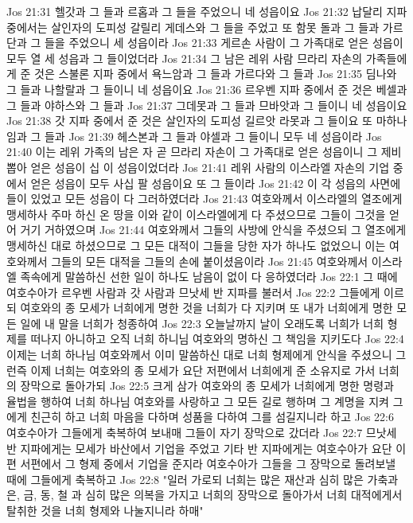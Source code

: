 Jos 21:31  헬갓과 그 들과 르홉과 그 들을 주었으니 네 성읍이요
Jos 21:32  납달리 지파 중에서는 살인자의 도피성 갈릴리 게데스와 그 들을 주었고 또 함못 돌과 그 들과 가르단과 그 들을 주었으니 세 성읍이라
Jos 21:33  게르손 사람이 그 가족대로 얻은 성읍이 모두 열 세 성읍과 그 들이었더라
Jos 21:34  그 남은 레위 사람 므라리 자손의 가족들에게 준 것은 스불론 지파 중에서 욕느암과 그 들과 가르다와 그 들과
Jos 21:35  딤나와 그 들과 나할랄과 그 들이니 네 성읍이요
Jos 21:36  르우벤 지파 중에서 준 것은 베셀과 그 들과 야하스와 그 들과
Jos 21:37  그데못과 그 들과 므바앗과 그 들이니 네 성읍이요
Jos 21:38  갓 지파 중에서 준 것은 살인자의 도피성 길르앗 라못과 그 들이요 또 마하나임과 그 들과
Jos 21:39  헤스본과 그 들과 야셀과 그 들이니 모두 네 성읍이라
Jos 21:40  이는 레위 가족의 남은 자 곧 므라리 자손이 그 가족대로 얻은 성읍이니 그 제비뽑아 얻은 성읍이 십 이 성읍이었더라
Jos 21:41  레위 사람의 이스라엘 자손의 기업 중에서 얻은 성읍이 모두 사십 팔 성읍이요 또 그 들이라
Jos 21:42  이 각 성읍의 사면에 들이 있었고 모든 성읍이 다 그러하였더라
Jos 21:43  여호와께서 이스라엘의 열조에게 맹세하사 주마 하신 온 땅을 이와 같이 이스라엘에게 다 주셨으므로 그들이 그것을 얻어 거기 거하였으며
Jos 21:44  여호와께서 그들의 사방에 안식을 주셨으되 그 열조에게 맹세하신 대로 하셨으므로 그 모든 대적이 그들을 당한 자가 하나도 없었으니 이는 여호와께서 그들의 모든 대적을 그들의 손에 붙이셨음이라
Jos 21:45  여호와께서 이스라엘 족속에게 말씀하신 선한 일이 하나도 남음이 없이 다 응하였더라
Jos 22:1  그 때에 여호수아가 르우벤 사람과 갓 사람과 므낫세 반 지파를 불러서
Jos 22:2  그들에게 이르되 여호와의 종 모세가 너희에게 명한 것을 너희가 다 지키며 또 내가 너희에게 명한 모든 일에 내 말을 너희가 청종하여
Jos 22:3  오늘날까지 날이 오래도록 너희가 너희 형제를 떠나지 아니하고 오직 너희 하니님 여호와의 명하신 그 책임을 지키도다
Jos 22:4  이제는 너희 하나님 여호와께서 이미 말씀하신 대로 너희 형제에게 안식을 주셨으니 그런즉 이제 너희는 여호와의 종 모세가 요단 저편에서 너희에게 준 소유지로 가서 너희의 장막으로 돌아가되
Jos 22:5  크게 삼가 여호와의 종 모세가 너희에게 명한 명령과 율법을 행하여 너희 하나님 여호와를 사랑하고 그 모든 길로 행하며 그 계명을 지켜 그에게 친근히 하고 너희 마음을 다하며 성품을 다하여 그를 섬길지니라 하고
Jos 22:6  여호수아가 그들에게 축복하여 보내매 그들이 자기 장막으로 갔더라
Jos 22:7  므낫세 반 지파에게는 모세가 바산에서 기업을 주었고 기타 반 지파에게는 여호수아가 요단 이편 서편에서 그 형제 중에서 기업을 준지라 여호수아가 그들을 그 장막으로 돌려보낼 때에 그들에게 축복하고
Jos 22:8  "일러 가로되 너희는 많은 재산과 심히 많은 가축과 은, 금, 동, 철 과 심히 많은 의복을 가지고 너희의 장막으로 돌아가서 너희 대적에게서 탈취한 것을 너희 형제와 나눌지니라 하매"
